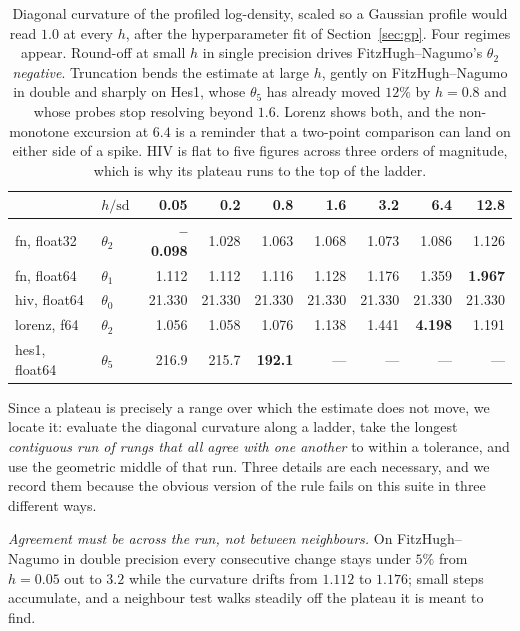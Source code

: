\documentclass[11pt]{article}
\theoremstyle{plain}
\theoremstyle{definition}
\theoremstyle{remark}
\begin{document}
\begin{table}[t]
\centering\small
\begin{tabular}{llrrrrrrr}
\toprule
& $h/\mathrm{sd}$ & 0.05 & 0.2 & 0.8 & 1.6 & 3.2 & 6.4 & 12.8\\
\midrule
fn, float32   & $\theta_2$ & \textbf{--0.098} & 1.028 & 1.063 & 1.068 & 1.073 & 1.086 & 1.126\\
fn, float64   & $\theta_1$ & 1.112 & 1.112 & 1.116 & 1.128 & 1.176 & 1.359 & \textbf{1.967}\\
hiv, float64  & $\theta_0$ & 21.330 & 21.330 & 21.330 & 21.330 & 21.330 & 21.330 & 21.330\\
lorenz, f64   & $\theta_2$ & 1.056 & 1.058 & 1.076 & 1.138 & 1.441 & \textbf{4.198} & 1.191\\
hes1, float64 & $\theta_5$ & 216.9 & 215.7 & \textbf{192.1} & --- & --- & --- & ---\\
\bottomrule
\end{tabular}
\caption{Diagonal curvature of the profiled log-density, scaled so a Gaussian profile would read
$1.0$ at every $h$, after the hyperparameter fit of Section~\ref{sec:gp}. Four regimes appear.
Round-off at small $h$ in single precision drives FitzHugh--Nagumo's $\theta_2$ \emph{negative}.
Truncation bends the estimate at large $h$, gently on FitzHugh--Nagumo in double and sharply on
Hes1, whose $\theta_5$ has already moved $12\%$ by $h = 0.8$ and whose probes stop resolving
beyond $1.6$. Lorenz shows both, and the non-monotone excursion at $6.4$ is a reminder that a
two-point comparison can land on either side of a spike. HIV is flat to five figures across three
orders of magnitude, which is why its plateau runs to the top of the ladder.}
\label{tab:stencil}
\end{table}

Since a plateau is precisely a range over which the estimate does not move, we locate it: evaluate
the diagonal curvature along a ladder, take the longest \emph{contiguous run of rungs that all
agree with one another} to within a tolerance, and use the geometric middle of that run. Three
details are each necessary, and we record them because the obvious version of the rule fails on
this suite in three different ways.

\emph{Agreement must be across the run, not between neighbours.} On FitzHugh--Nagumo in double
precision every consecutive change stays under $5\%$ from $h = 0.05$ out to $3.2$ while the
curvature drifts from $1.112$ to $1.176$; small steps accumulate, and a neighbour test walks
steadily off the plateau it is meant to find.
\end{document}
